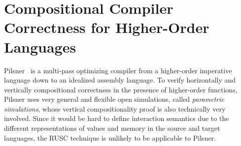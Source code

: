 {%



\section{Compositional Compiler Correctness for Higher-Order Languages}

%
Pilsner~\cite{neis:pilsner,pb} is a multi-pass optimizing compiler from
a higher-order imperative language down to an idealized assembly language.
To verify horizontally and vertically compositional correctness in the presence of higher-order functions, Pilsner uses
very general and flexible open simulations, called \emph{parametric simulations},
whose vertical compositionality proof is also technically very involved.
Since it would be hard to define interaction semantics
due to the different representations of values and
memory in the source and target languages,
the RUSC technique is unlikely to be applicable to Pilsner.

}
